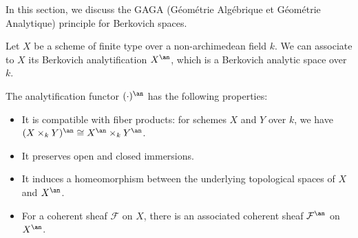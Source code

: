     
    In this section, we discuss the GAGA (Géométrie Algébrique et Géométrie Analytique) principle for Berkovich spaces.

    \begin{construction}\label{constr:Berkovich_analytification_functor}
        Let \(X\) be a scheme of finite type over a non-archimedean field \(k\). 
        We can associate to \(X\) its Berkovich analytification \(X^{\an}\), which is a Berkovich analytic space over \(k\).

        The analytification functor \( (\cdot)^{\an} \) has the following properties:   
        \begin{itemize}
            \item It is compatible with fiber products: for schemes \(X\) and \(Y\) over \(k\), we have \((X \times_k Y)^{\an} \cong X^{\an} \times_k Y^{\an}\).
            \item It preserves open and closed immersions.
            \item It induces a homeomorphism between the underlying topological spaces of \(X\) and \(X^{\an}\).
            \item For a coherent sheaf \(\mathcal{F}\) on \(X\), there is an associated coherent sheaf \(\mathcal{F}^{\an}\) on \(X^{\an}\).
        \end{itemize}
    \end{construction}
